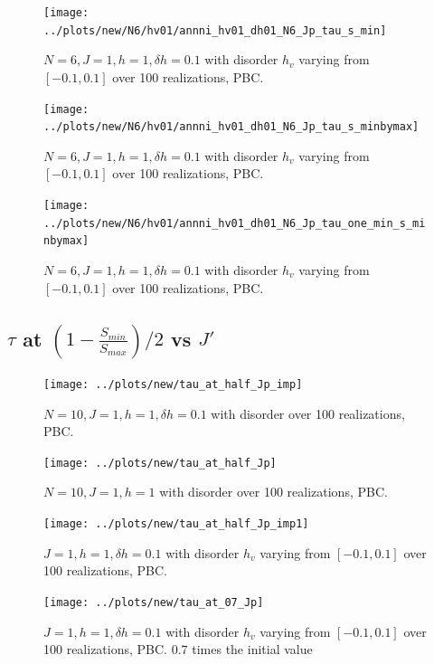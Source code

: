 \documentclass[a4paper]{article}
\begin{document}
\begin{figure}[h!]
  \centering
  \texttt{[image: ../plots/new/N6/hv01/annni\_hv01\_dh01\_N6\_Jp\_tau\_s\_min]}
  \caption{$N = 6, J = 1, h = 1, \delta h=0.1$ with disorder $h_v$ varying from $[-0.1,0.1]$ over 100 realizations, PBC.}
  \label{fig:}
\end{figure}

\begin{figure}[h!]
  \centering
  \texttt{[image: ../plots/new/N6/hv01/annni\_hv01\_dh01\_N6\_Jp\_tau\_s\_minbymax]}
  \caption{$N = 6, J = 1, h = 1, \delta h=0.1$ with disorder $h_v$ varying from $[-0.1,0.1]$ over 100 realizations, PBC.}
  \label{fig:}
\end{figure}

\begin{figure}[h!]
  \centering
  \texttt{[image: ../plots/new/N6/hv01/annni\_hv01\_dh01\_N6\_Jp\_tau\_one\_min\_s\_minbymax]}
  \caption{$N = 6, J = 1, h = 1, \delta h=0.1$ with disorder $h_v$ varying from $[-0.1,0.1]$ over 100 realizations, PBC.}
  \label{fig:}
\end{figure}



\clearpage
\subsection{$\tau$ at $(1-\frac{S_{min}}{S_{max}})/2$ vs $J'$}
\begin{figure}[h!]
  \centering
  \texttt{[image: ../plots/new/tau\_at\_half\_Jp\_imp]}
  \caption{$N = 10, J = 1, h = 1, \delta h=0.1$ with disorder over 100 realizations, PBC.}
  \label{fig:}
\end{figure}

\begin{figure}[h!]
  \centering
  \texttt{[image: ../plots/new/tau\_at\_half\_Jp]}
  \caption{$N = 10, J = 1, h = 1$ with disorder over 100 realizations, PBC.}
  \label{fig:}
\end{figure}


\clearpage
\begin{figure}[h!]
  \centering
  \texttt{[image: ../plots/new/tau\_at\_half\_Jp\_imp1]}
  \caption{$J = 1, h = 1, \delta h=0.1$ with disorder $h_v$ varying from $[-0.1,0.1]$ over 100 realizations, PBC.}
  \label{fig:}
\end{figure}

\begin{figure}[h!]
  \centering
  \texttt{[image: ../plots/new/tau\_at\_07\_Jp]}
  \caption{$J = 1, h = 1, \delta h=0.1$ with disorder $h_v$ varying from $[-0.1,0.1]$ over 100 realizations, PBC. $0.7$ times the initial value}
  \label{fig:}
\end{figure}
\end{document}
